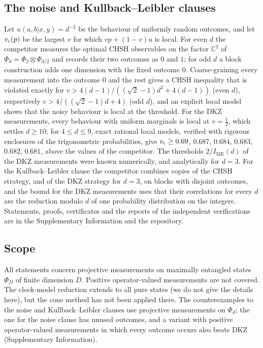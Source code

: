 \documentclass[11pt]{article}
\newcommand{\C}{\mathbb{C}}
\newcommand{\IME}{I_{\mathrm{ME}}}
\begin{document}
\subsection*{The noise and Kullback--Leibler clauses}
Let $u(a,b|x,y)=d^{-2}$ be the behaviour of uniformly random outcomes, and let $v_{\rm c}(p)$ be the largest $v$ for
which $vp+(1-v)u$ is local. For even $d$ the competitor measures the optimal CHSH observables on the factor $\C^2$ of
$\Phi_d=\Phi_2\otimes\Phi_{d/2}$ and records their two outcomes as $0$ and $1$; for odd $d$ a block construction adds
one dimension with the fixed outcome $0$. Coarse-graining every measurement into the outcome $0$ and the rest gives a
CHSH inequality that is violated exactly for $v>4(d-1)/((\sqrt2-1)d^2+4(d-1))$ (even $d$), respectively
$v>4/((\sqrt2-1)d+4)$ (odd $d$), and an explicit local model shows that the noisy behaviour is local at the threshold.
For the DKZ measurements, every behaviour with uniform marginals is local at $v=\frac12$, which settles $d\ge10$; for
$4\le d\le9$, exact rational local models, verified with rigorous enclosures of the trigonometric probabilities, give
$v_{\rm c}\ge0.69$, $0.687$, $0.684$, $0.683$, $0.682$, $0.681$, above the values of the competitor. The thresholds
$2/\IME(d)$ of the DKZ measurements were known numerically\cite{KGZMZ2000,DKZ2001,CGLMP2002,GLZ2012}, and analytically
for $d=3$\cite{Chen2001}. For the Kullback--Leibler clause the competitor combines copies of the CHSH strategy, and of
the DKZ strategy for $d=3$, on blocks with disjoint outcomes, and the bound for the DKZ measurements uses that their
correlations for every $d$ are the reduction modulo $d$ of one probability distribution on the integers. Statements,
proofs, certificates and the reports of the independent verifications are in the Supplementary Information and the
repository\cite{repoOQP27}.

\subsection*{Scope}
All statements concern projective measurements on maximally entangled states $\Phi_D$ of finite dimension $D$. Positive
operator-valued measurements are not covered. The clock-model reduction extends to all pure states (we do not give
the details here), but the cone method has not been applied there. The counterexamples to the noise and
Kullback--Leibler clauses use projective measurements on $\Phi_d$; the one for the noise clause has unused outcomes, and
a variant with positive operator-valued measurements in which every outcome occurs also beats DKZ (Supplementary
Information).
\end{document}
